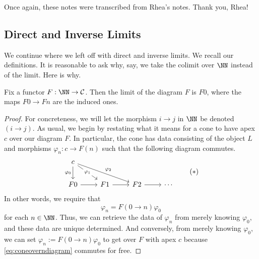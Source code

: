 
Once again, these notes were transcribed from Rhea's notes. Thank you, Rhea!

\subsection{Direct and Inverse Limits}
We continue where we left off with direct and inverse limits. We recall our definitions.
\directlimdef*
\invlimdef*
\noindent It is reasonable to ask why, say, we take the colimit over $\NN$ instead of the limit. Here is why.
\begin{exe}
	Fix a functor $F:\NN\to\mathcal C$. Then the limit of the diagram $F$ is $F0$, where the maps $F0\to Fn$ are the induced ones.
\end{exe}
\begin{proof}
	For concreteness, we will let the morphism $i\to j$ in $\NN$ be denoted $(i\to j)$. As usual, we begin by restating what it means for a cone to have apex $c$ over our diagram $F$. In particular, the cone has data consisting of the object $L$ and morphisms $\varphi_n:c\to F(n)$ such that the following diagram commutes.
	\[\begin{tikzcd}
		c \\
		F0 & F1 & F2 & \cdots
		\arrow["{\varphi_0}"', from=1-1, to=2-1]
		\arrow[from=2-1, to=2-2]
		\arrow[from=2-2, to=2-3]
		\arrow[from=2-3, to=2-4]
		\arrow["{\varphi_1}"{description}, from=1-1, to=2-2]
		\arrow["{\varphi_2}", from=1-1, to=2-3]
	\end{tikzcd}\tag{$*$}\label{eq:coneoverndiagram}\]
	In other words, we require that
	\[\varphi_n=F(0\to n)\varphi_0\]
	for each $n\in\NN$. Thus, we can retrieve the data of $\varphi_n$ from merely knowing $\varphi_0$, and these data are unique determined. And conversely, from merely knowing $\varphi_0$, we can set $\varphi_n:=F(0\to n)\varphi_0$ to get over $F$ with apex $c$ because \autoref{eq:coneoverndiagram} commutes for free.


\end{proof}
